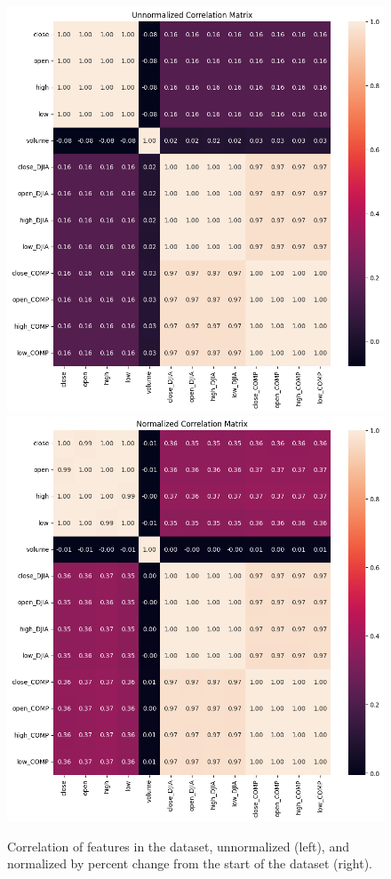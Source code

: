 \documentclass[conference]{IEEEtran}
\begin{document}
\begin{figure}
    \centering
    \includegraphics[width=\columnwidth]{figures/unnormCorr.png}
    \includegraphics[width=\columnwidth]{figures/normCorr.png}
    \caption{Correlation of features in the dataset, unnormalized (left), and normalized by percent change from the start of the dataset (right).}
    \label{figure:correlations}
\end{figure}
\end{document}
